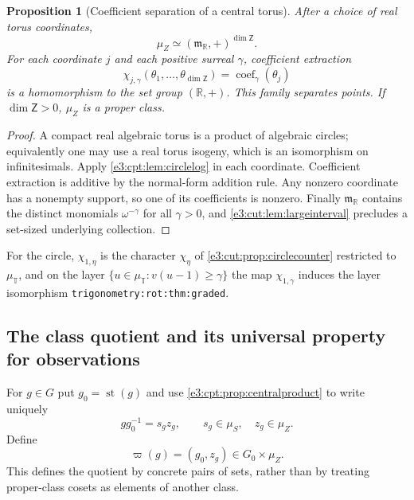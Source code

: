\documentclass[11pt,letterpaper]{article}
\numberwithin{equation}{section}
\newtheorem{proposition}[proposition]{Proposition}
\theoremstyle{definition}
\theoremstyle{remark}
\newcommand{\R}{\mathbb R}
\newcommand{\TT}{\mathbb T}
\newcommand{\mm}{\mathfrak m}
\newcommand{\st}{\operatorname{st}}
\newcommand{\coef}{\operatorname{coef}}
\newcommand{\sZ}{\mathsf Z}
\begin{document}
\begin{proposition}[Coefficient separation of a central torus]\label{e3:cpt:prop:separation}
After a choice of real torus coordinates,
\[
 \mu_Z\simeq(\mm_{\R},+)^{\dim\sZ}.
\]
For each coordinate $j$ and each positive surreal $\gamma$, coefficient
extraction
\[
 \chi_{j,\gamma}(\theta_1,\ldots,\theta_{\dim\sZ})=\coef_\gamma(\theta_j)
\]
is a homomorphism to the set group $(\R,+)$. This family separates points. If
$\dim\sZ>0$, $\mu_Z$ is a proper class.
\end{proposition}
\begin{proof}
A compact real algebraic torus is a product of algebraic circles; equivalently
one may use a real torus isogeny, which is an isomorphism on infinitesimals.
Apply \cref{e3:cpt:lem:circlelog} in each coordinate. Coefficient extraction is
additive by the normal-form addition rule. Any nonzero coordinate has a nonempty
support, so one of its coefficients is nonzero. Finally $\mm_{\R}$ contains the
distinct monomials $\omega^{-\gamma}$ for all $\gamma>0$, and
\cref{e3:cut:lem:largeinterval} precludes a set-sized underlying collection.
\end{proof}

For the circle, $\chi_{1,\eta}$ is the character $\chi_\eta$ of
\cref{e3:cut:prop:circlecounter} restricted to $\mu_{\TT}$, and on the layer
$\{u\in\mu_{\TT}:v(u-1)\ge\gamma\}$ the map $\chi_{1,\gamma}$ induces the layer
isomorphism \texttt{trigonometry:rot:thm:graded}.

\subsection{The class quotient and its universal property for observations}

For $g\in G$ put $g_0=\st(g)$ and use \cref{e3:cpt:prop:centralproduct} to write
uniquely
\[
 g g_0^{-1}=s_g z_g,
 \qquad s_g\in\mu_S,\quad z_g\in\mu_Z.
\]
Define
\begin{equation}\label{e3:cpt:eq:q}
 \varpi(g)=(g_0,z_g)\in G_0\times\mu_Z.
\end{equation}
This defines the quotient by concrete pairs of sets, rather than by treating
proper-class cosets as elements of another class.
\end{document}

